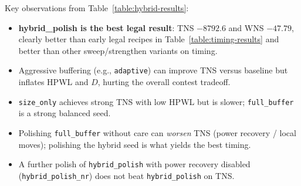 \documentclass[conference]{IEEEtran}
\begin{document}
\begin{table}[htbp]
\caption{Extended Legal Strategies on \texttt{aes\_cipher\_top} (OpenROAD v2.0-17598)}
\centering
{}
\label{table:hybrid-results}
\end{table}

Key observations from Table~\ref{table:hybrid-results}:
\begin{itemize}
    \item \textbf{hybrid\_polish is the best legal result}: TNS $-8792.6$ and WNS $-47.79$, clearly better than early legal recipes in Table~\ref{table:timing-results} and better than other sweep/strengthen variants on timing.
    \item Aggressive buffering (e.g., \texttt{adaptive}) can improve TNS versus baseline but inflates HPWL and $D$, hurting the overall contest tradeoff.
    \item \texttt{size\_only} achieves strong TNS with low HPWL but is slower; \texttt{full\_buffer} is a strong balanced seed.
    \item Polishing \texttt{full\_buffer} without care can \emph{worsen} TNS (power recovery / local moves); polishing the hybrid seed is what yields the best timing.
    \item A further polish of \texttt{hybrid\_polish} with power recovery disabled (\texttt{hybrid\_polish\_nr}) does not beat \texttt{hybrid\_polish} on TNS.
\end{itemize}
\end{document}
